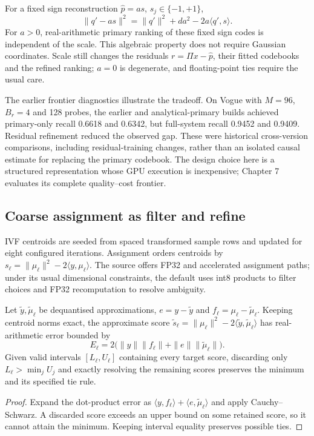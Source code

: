 For a fixed sign reconstruction $\widehat p=a s$, $s_j\in\{-1,+1\}$,
\begin{equation}
 \|q'-a s\|^2=\|q'\|^2+da^2-2a\langle q',s\rangle.
 \label{eq:4-sign-ranking}
\end{equation}
For $a>0$, real-arithmetic primary ranking of these fixed sign codes is
independent of the scale. This algebraic property does not require
Gaussian coordinates. Scale still changes the residuals
$r=\Pi x-\widehat p$, their fitted codebooks and the refined ranking;
$a=0$ is degenerate, and floating-point ties require the usual care.

The earlier frontier diagnostics illustrate the tradeoff. On Vogue
with $M=96$, $B_r=4$ and 128 probes, the earlier and analytical-primary
builds achieved primary-only recall 0.6618 and 0.6342, but full-system
recall 0.9452 and 0.9409. Residual refinement reduced the observed gap.
These were historical cross-version comparisons, including residual-training
changes, rather than an isolated causal estimate for replacing the
primary codebook. The design choice here is a structured representation
whose GPU execution is inexpensive; Chapter 7 evaluates its complete
quality--cost frontier.

\subsection{Coarse assignment as filter and refine}

IVF centroids are seeded from spaced transformed sample rows and updated
for eight configured iterations. Assignment orders centroids by
$s_\ell=\|\mu_\ell\|^2-2\langle y,\mu_\ell\rangle$.
The source offers FP32 and accelerated assignment paths; under its usual
dimensional constraints, the default uses int8 products to filter choices
and FP32 recomputation to resolve ambiguity.

\begin{resultblock}
\begin{lemma}
\label{lem:4-assignment-bound}
Let $\widetilde y,\widetilde\mu_\ell$ be dequantised approximations,
$e=y-\widetilde y$ and $f_\ell=\mu_\ell-\widetilde\mu_\ell$.
Keeping centroid norms exact, the approximate score
$\widetilde s_\ell=\|\mu_\ell\|^2-2\langle\widetilde y,\widetilde\mu_\ell\rangle$
has real-arithmetic error bounded by
\begin{equation}
 E_\ell=2\bigl(\|y\|\|f_\ell\|+\|e\|\|\widetilde\mu_\ell\|\bigr).
 \label{eq:4-assignment-bound}
\end{equation}
Given valid intervals $[L_\ell,U_\ell]$ containing every target score,
discarding only $L_\ell>\min_j U_j$ and exactly resolving the remaining
scores preserves the minimum and its specified tie rule.
\end{lemma}
\begin{proof}
Expand the dot-product error as
$\langle y,f_\ell\rangle+\langle e,\widetilde\mu_\ell\rangle$
and apply Cauchy--Schwarz. A discarded score exceeds an upper bound on
some retained score, so it cannot attain the minimum. Keeping interval
equality preserves possible ties.
\end{proof}
\end{resultblock}


